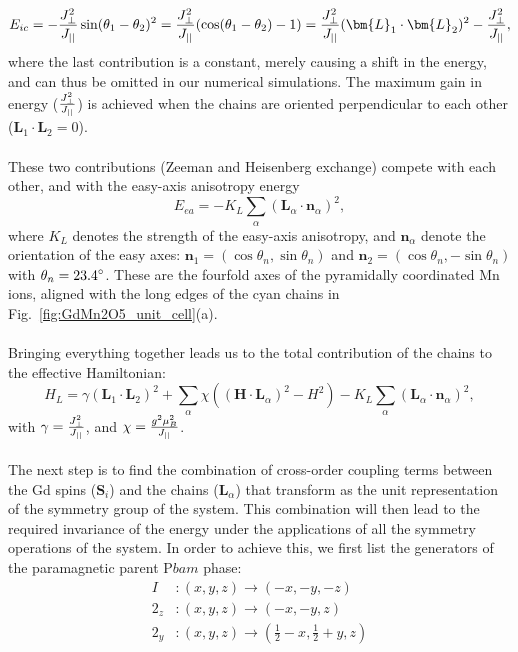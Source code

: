 \begin{equation}
	E_{ic} = -\frac{\Jperp^2}{\Jpar}\sin(\theta_1 - \theta_2)^2 =  \frac{\Jperp^2}{\Jpar}(\cos(\theta_1 - \theta_2) - 1) = \frac{\Jperp^2}{\Jpar}(\bm{L}_1 \cdot \bm{L}_2)^2 - \frac{\Jperp^2}{\Jpar},
\end{equation}
where the last contribution is a constant, merely causing a shift in the energy, and can thus be omitted in our numerical simulations.
The maximum gain in energy ($\frac{J_{\perp}^2}{J_{||}}$) is achieved when the chains are oriented perpendicular to each other ($\bm L_1 \cdot \bm L_2 = 0$).
\\\\
These two contributions (Zeeman and Heisenberg exchange) compete with each other, and with the easy-axis anisotropy energy
\begin{equation}
	E_{ea} = -K_L\sum_\alpha(\bm{L}_\alpha\cdot \bm{n}_\alpha)^2,
\end{equation}
where $K_L$ denotes the strength of the easy-axis anisotropy, and $\bm n_\alpha$ denote the orientation of the easy axes:
$\bm{n}_1=\left(\cos\theta_n, \sin\theta_n\right)$ and $\bm{n}_2=\left(\cos\theta_n, -\sin\theta_n\right)$ with $\theta_n = \rm{23.4}^\circ$.
These are the fourfold axes of the pyramidally coordinated Mn ions, aligned with the long edges of the cyan chains in Fig.~\ref{fig:GdMn2O5_unit_cell}(a).
\\\\
Bringing everything together leads us to the total contribution of the chains to the effective Hamiltonian:
\begin{equation}
	H_L = \gamma(\bm{L}_1\cdot \bm{L}_2)^2
    +\sum_{\alpha}\chi((\bm{H}\cdot \bm{L}_\alpha)^2-H^2)
    -K_L\sum_\alpha(\bm{L}_\alpha\cdot \bm{n}_\alpha)^2\label{eq:GdMn2O5_hami_1},
\end{equation}
with $\gamma = \frac{J_{\perp}^2}{J_{||}}$, and $\chi = \frac{g^2\mu_B^2}{J_{||}}$. 
\\\\
The next step is to find the combination of cross-order coupling terms between the Gd spins ($\bm S_i$) and the chains ($\bm L_\alpha$) that transform as the unit representation of the symmetry group of the system.
This combination will then lead to the required invariance of the energy under the applications of all the symmetry operations of the system.
In order to achieve this, we first list the generators of the paramagnetic parent P$bam$ phase:
\begin{align}
	I &: (x, y, z) \rightarrow (-x, -y, -z)\\
	2_z &: (x, y, z) \rightarrow (-x, -y, z)\\
	2_y &: (x, y, z) \rightarrow (\frac{1}{2} - x, \frac{1}{2} + y, z)
\end{align}
